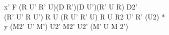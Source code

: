 x' F (R U' R' U)(D R')(D U')(R' U R) D2'\\
(R' U' R U') R U (R U' R' U) R U R2 U' R' (U2) *\\
y (M2' U' M') U2' M2' U2' (M' U M 2')\\
